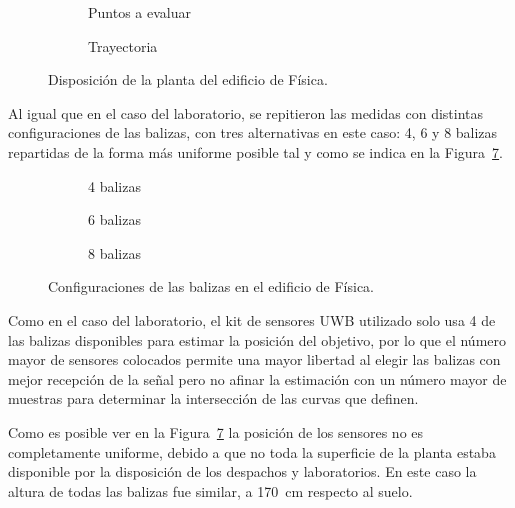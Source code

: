 \begin{figure}[H]
  \begin{subfigure}[b]{.5\textwidth}
    \centering
    \def\svgwidth{0.75\linewidth}
     
    \caption{Puntos a evaluar}
    \label{fig:puntos_fisica}
  \end{subfigure}
  \begin{subfigure}[b]{.5\textwidth}
    \centering
    \def\svgwidth{0.75\linewidth}
     
    \caption{Trayectoria}
    \label{fig:trayecto_fisica}
  \end{subfigure}
  \caption{Disposición de la planta del edificio de Física.}
  \label{fig:fisica}
\end{figure}

Al igual que en el caso del laboratorio, se repitieron las medidas con distintas configuraciones de las balizas, con tres alternativas en este caso: 4, 6 y 8 balizas repartidas de la forma más uniforme posible tal y como se indica en la Figura~\ref{fig:sensores_fisica}.

\begin{figure}[H]
  \begin{subfigure}[b]{.3\textwidth}
    \centering
    \def\svgwidth{0.9\linewidth}
     
    \caption{4 balizas}
    \label{fig:sensores_fisica_4}
  \end{subfigure}
  \begin{subfigure}[b]{.3\textwidth}
    \centering
    \def\svgwidth{0.9\linewidth}
      
    \caption{6 balizas}
    \label{fig:sensores_fisica_6}
  \end{subfigure}
  \begin{subfigure}[b]{.3\textwidth}
    \centering
    \def\svgwidth{0.9\linewidth}
      
    \caption{8 balizas}
    \label{fig:sensores_fisica_8}
  \end{subfigure}
  \caption{Configuraciones de las balizas en el edificio de Física.}
  \label{fig:sensores_fisica}
\end{figure}

Como en el caso del laboratorio, el kit de sensores UWB utilizado solo usa 4 de las balizas disponibles para estimar la posición del objetivo, por lo que el número mayor de sensores colocados permite una mayor libertad al elegir las balizas con mejor recepción de la señal pero no afinar la estimación con un número mayor de muestras para determinar la intersección de las curvas que definen.

Como es posible ver en la Figura~\ref{fig:sensores_fisica} la posición de los sensores no es completamente uniforme, debido a que no toda la superficie de la planta estaba disponible por la disposición de los despachos y laboratorios.
En este caso la altura de todas las balizas fue similar, a 170~cm respecto al suelo.